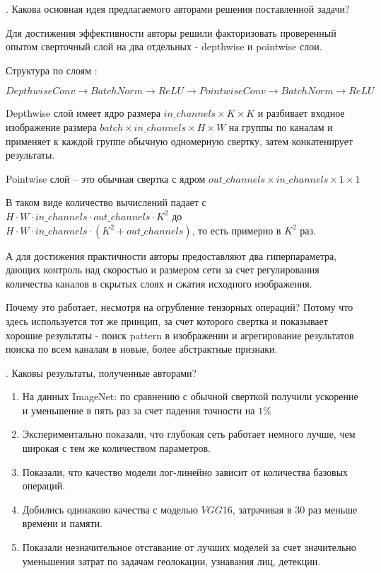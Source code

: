 \documentclass[10pt]{article}
\begin{document}
	. Какова основная идея предлагаемого авторами решения поставленной задачи?
	\medskip
	
	Для достижения эффективности авторы решили факторизовать проверенный опытом сверточный слой на два отдельных - depthwise и pointwise слои.
	
	Структура по слоям :
	
	$$DepthwiseConv \rightarrow BatchNorm \rightarrow ReLU \rightarrow PointwiseConv \rightarrow BatchNorm \rightarrow ReLU$$
	
	Depthwise слой имеет ядро размера $in\_channels \times K \times K$ и разбивает входное изображение размера $batch \times in\_channels \times H \times W$ на группы по каналам и применяет к каждой группе обычную одномерную свертку, затем конкатенирует результаты.
	
	Pointwise слой -- это обычная свертка с ядром $out\_channels \times in\_channels \times 1 \times 1$
	
	В таком виде количество вычислений падает с $H \cdot W \cdot in\_channels \cdot out\_channels \cdot K^2$ до $H \cdot W \cdot in\_channels \cdot ( K^2 + out\_channels) $, то есть примерно в $K^2$ раз.
	
	А для достижения практичности авторы  предоставляют два гиперпараметра, дающих контроль над скоростью и размером сети за счет регулирования количества каналов в скрытых слоях и сжатия исходного изображения.
	
	Почему это работает, несмотря на огрубление тензорных операций? Потому что здесь используется тот же принцип, за счет которого свертка и показывает хорошие результаты - поиск pattern в изображении и агрегирование результатов поиска по всем каналам в новые, более абстрактные признаки. 
	
	. Каковы результаты, полученные авторами?
	\medskip
	
	\begin{enumerate}
		\item На данных ImageNet: по сравнению с обычной сверткой получили ускорение и уменьшение в пять раз за счет падения точности на $1\%$
		\item Экспериментально показали, что глубокая сеть работает немного лучше, чем широкая с тем же количеством параметров.
		\item Показали, что качество модели лог-линейно зависит от количества базовых операций.
		\item Добились одинаково качества с моделью $VGG 16$, затрачивая в 30 раз меньше времени и памяти.
		\item Показали незначительное отставание от лучших моделей за счет значительно уменьшения затрат по задачам геолокации, узнавания лиц, детекции.
	\end{enumerate}
	
\end{document}
